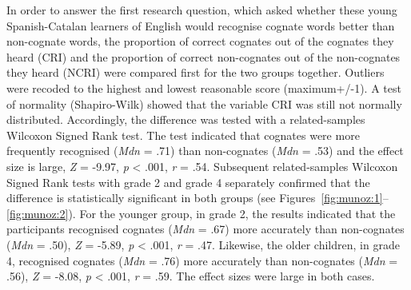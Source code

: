 \documentclass[output=paper,modfonts,nonflat,newtxmath]{langsci/langscibook}
\begin{document}
\begin{table}
\caption{Descriptive statistics}
\label{tab:munoz:1}
\end{table}

{In order to answer the first research question, which asked whether these young Spanish-Catalan learners of English would recognise cognate words better than non-cognate words, the proportion of correct cognates out of the cognates they heard (CRI) and the proportion of correct non-cognates out of the non-cognates they heard (NCRI) were compared first for the two groups together. Outliers were recoded to the highest and lowest reasonable score (maximum+/-1). A test of normality (Shapiro-Wilk) showed that the variable CRI was still not normally distributed. Accordingly, the difference was tested with a related-samples Wilcoxon Signed Rank test. The test indicated that cognates were more frequently recognised (}{\textit{Mdn}} {= .71) than non-cognates (}{\textit{Mdn}} {= .53) and the effect size is large,} {\textit{Z} }{= -9.97,} {\textit{p} }{< .001,} {\textit{r} }{= .54. Subsequent related-samples Wilcoxon Signed Rank tests with grade 2 and grade 4 separately confirmed that the difference is statistically significant in both groups (see Figures~\ref{fig:munoz:1}--\ref{fig:munoz:2}). For the younger group, in grade 2, the results indicated that the participants recognised cognates (}{\textit{Mdn}} {= .67) more accurately than non-cognates (}{\textit{Mdn}} {= .50),} {\textit{Z} }{= -5.89,} {\textit{p} }{< .001,} {\textit{r} }{= .47. Likewise, the older children, in grade 4, recognised cognates (}{\textit{Mdn}} {= .76) more accurately than non-cognates (}{\textit{Mdn}} {= .56),} {\textit{Z} }{= -8.08,} {\textit{p} }{< .001,} {\textit{r} }{= .59. The effect sizes were large in both cases.}
\end{document}
